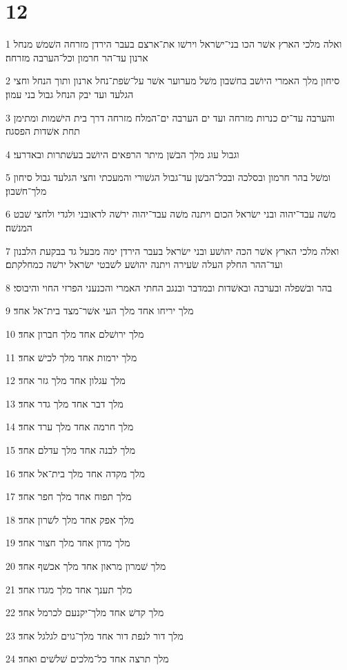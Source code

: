 \chapter{12}

\par 1 ואלה מלכי הארץ אשׁר הכו בני־ישׂראל וירשׁו את־ארצם בעבר הירדן מזרחה השׁמשׁ מנחל ארנון עד־הר חרמון וכל־הערבה מזרחה׃
\par 2 סיחון מלך האמרי היושׁב בחשׁבון משׁל מערוער אשׁר על־שׂפת־נחל ארנון ותוך הנחל וחצי הגלעד ועד יבק הנחל גבול בני עמון׃
\par 3 והערבה עד־ים כנרות מזרחה ועד ים הערבה ים־המלח מזרחה דרך בית הישׁמות ומתימן תחת אשׁדות הפסגה׃
\par 4 וגבול עוג מלך הבשׁן מיתר הרפאים היושׁב בעשׁתרות ובאדרעי׃
\par 5 ומשׁל בהר חרמון ובסלכה ובכל־הבשׁן עד־גבול הגשׁורי והמעכתי וחצי הגלעד גבול סיחון מלך־חשׁבון׃
\par 6 משׁה עבד־יהוה ובני ישׂראל הכום ויתנה משׁה עבד־יהוה ירשׁה לראובני ולגדי ולחצי שׁבט המנשׁה׃
\par 7 ואלה מלכי הארץ אשׁר הכה יהושׁע ובני ישׂראל בעבר הירדן ימה מבעל גד בבקעת הלבנון ועד־ההר החלק העלה שׂעירה ויתנה יהושׁע לשׁבטי ישׂראל ירשׁה כמחלקתם׃
\par 8 בהר ובשׁפלה ובערבה ובאשׁדות ובמדבר ובנגב החתי האמרי והכנעני הפרזי החוי והיבוסי׃
\par 9 מלך יריחו אחד מלך העי אשׁר־מצד בית־אל אחד׃
\par 10 מלך ירושׁלם אחד מלך חברון אחד׃
\par 11 מלך ירמות אחד מלך לכישׁ אחד׃
\par 12 מלך עגלון אחד מלך גזר אחד׃
\par 13 מלך דבר אחד מלך גדר אחד׃
\par 14 מלך חרמה אחד מלך ערד אחד׃
\par 15 מלך לבנה אחד מלך עדלם אחד׃
\par 16 מלך מקדה אחד מלך בית־אל אחד׃
\par 17 מלך תפוח אחד מלך חפר אחד׃
\par 18 מלך אפק אחד מלך לשׁרון אחד׃
\par 19 מלך מדון אחד מלך חצור אחד׃
\par 20 מלך שׁמרון מראון אחד מלך אכשׁף אחד׃
\par 21 מלך תענך אחד מלך מגדו אחד׃
\par 22 מלך קדשׁ אחד מלך־יקנעם לכרמל אחד׃
\par 23 מלך דור לנפת דור אחד מלך־גוים לגלגל אחד׃
\par 24 מלך תרצה אחד כל־מלכים שׁלשׁים ואחד׃

